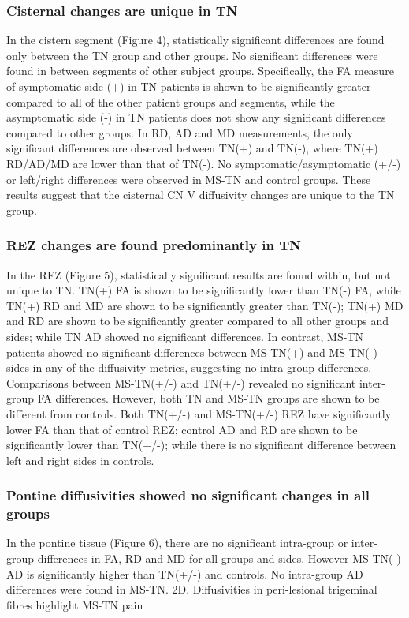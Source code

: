 \subsubsection{Cisternal changes are unique in TN}
In the cistern segment (Figure 4), statistically significant differences are found only between the TN group and other groups. No significant differences were found in between segments of other subject groups. Specifically, the FA measure of symptomatic side (+) in TN patients is shown to be significantly greater compared to all of the other patient groups and segments, while the asymptomatic side (-) in TN patients does not show any significant differences compared to other groups. In RD, AD and MD measurements, the only significant differences are observed between TN(+) and TN(-), where TN(+) RD/AD/MD are lower than that of TN(-). No symptomatic/asymptomatic (+/-) or left/right differences were observed in MS-TN and control groups. These results suggest that the cisternal CN V diffusivity changes are unique to the TN group. 

\subsubsection{REZ changes are found predominantly in TN}
In the REZ (Figure 5), statistically significant results are found within, but not unique to TN. TN(+) FA is shown to be significantly lower than TN(-) FA, while TN(+) RD and MD are shown to be significantly greater than TN(-); TN(+) MD and RD are shown to be significantly greater compared to all other groups and sides; while TN AD showed no significant differences. In contrast, MS-TN patients showed no significant differences between MS-TN(+) and MS-TN(-) sides in any of the diffusivity metrics, suggesting no intra-group differences. Comparisons between MS-TN(+/-) and TN(+/-) revealed no significant inter-group FA differences. However, both TN and MS-TN groups are shown to be different from controls. Both TN(+/-) and MS-TN(+/-) REZ have significantly lower FA than that of control REZ; control AD and RD are shown to be significantly lower than TN(+/-); while there is no significant difference between left and right sides in controls. 
\subsubsection{Pontine diffusivities showed no significant changes in all groups}
In the pontine tissue (Figure 6), there are no significant intra-group or inter-group differences in FA, RD and MD for all groups and sides. However MS-TN(-) AD is significantly higher than TN(+/-) and controls. No intra-group AD differences were found in MS-TN.
2D. Diffusivities in peri-lesional trigeminal fibres highlight MS-TN pain


